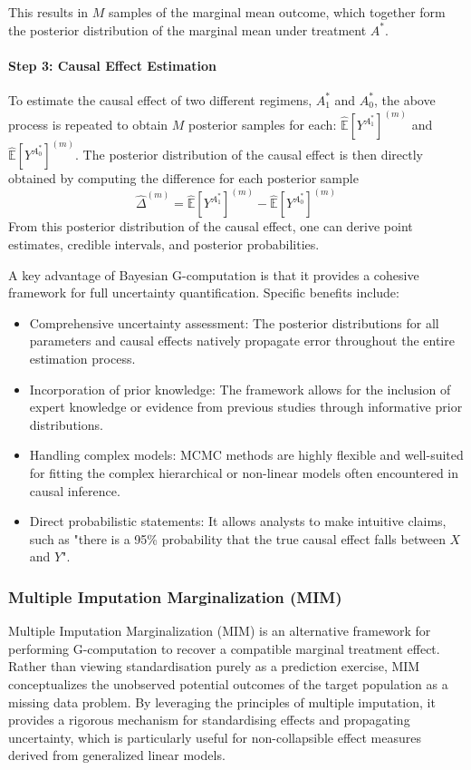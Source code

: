 \documentclass[article]{jss}
\begin{document}
This results in $M$ samples of the marginal mean outcome, which together form the posterior distribution of the marginal mean under treatment $A^*$.

\paragraph{Step 3: Causal Effect Estimation}
To estimate the causal effect of two different regimens, $A_1^*$ and $A_0^*$, the above process is repeated to obtain $M$ posterior samples for each: $\hat{\mathbb{E}}[Y^{A_1^*}]^{(m)}$ and $\hat{\mathbb{E}}[Y^{A_0^*}]^{(m)}$.
The posterior distribution of the causal effect is then directly obtained by computing the difference for each posterior sample
$$
\hat{\Delta}^{(m)} = \hat{\mathbb{E}}[Y^{A_1^*}]^{(m)} - \hat{\mathbb{E}}[Y^{A_0^*}]^{(m)}
$$
From this posterior distribution of the causal effect, one can derive point estimates, credible intervals, and posterior probabilities.

A key advantage of Bayesian G-computation is that it provides a cohesive framework for full uncertainty quantification. Specific benefits include:
\begin{itemize}
    \item Comprehensive uncertainty assessment: The posterior distributions for all parameters and causal effects natively propagate error throughout the entire estimation process.
    \item Incorporation of prior knowledge: The framework allows for the inclusion of expert knowledge or evidence from previous studies through informative prior distributions.
    \item Handling complex models: MCMC methods are highly flexible and well-suited for fitting the complex hierarchical or non-linear models often encountered in causal inference.
    \item Direct probabilistic statements: It allows analysts to make intuitive claims, such as "there is a 95\% probability that the true causal effect falls between $X$ and $Y$".
\end{itemize}

%
\subsubsection{Multiple Imputation Marginalization (MIM)}
Multiple Imputation Marginalization (MIM) is an alternative framework for performing G-computation to recover a compatible marginal treatment effect. Rather than viewing standardisation purely as a prediction exercise, MIM conceptualizes the unobserved potential outcomes of the target population as a missing data problem. By leveraging the principles of multiple imputation, it provides a rigorous mechanism for standardising effects and propagating uncertainty, which is particularly useful for non-collapsible effect measures derived from generalized linear models.
\end{document}
